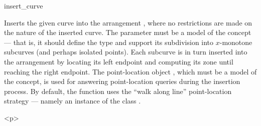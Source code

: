 
\ccRefPageBegin

\begin{ccRefFunction}{insert_curve}


   {Inserts the given curve  into the arrangement , where
    no restrictions are made on the nature of the inserted curve.
    The  parameter must be a model of the
    concept --- that is, it should define the  type and support
    its subdivision into $x$-monotone subcurves (and perhaps isolated points).
    Each subcurve is in turn inserted into the arrangement by locating its
    left endpoint and computing its zone until reaching the right endpoint.
    The point-location object , which must be a model of the
     concept, is used for answering
    point-location queries during the insertion process.
    By default, the function uses the ``walk along line'' point-location
    strategy --- namely an instance of the class
    .
    }


\begin{ccHtmlOnly}<p>\end{ccHtmlOnly}


\end{ccRefFunction}
